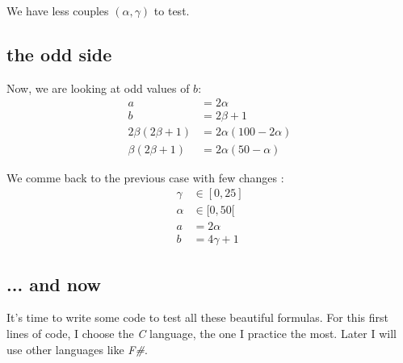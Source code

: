 We have less couples $(\alpha, \gamma)$ to test.

\subsection{the odd side}
Now, we are looking at odd values of $b$:
\begin{equation}\label{eq:pow2odd}
\begin{split}
	a &= 2 \alpha \\
	b &= 2 \beta + 1\\
	2 \beta(2 \beta + 1) &= 2 \alpha(100 - 2 \alpha) \\
	\beta(2\beta + 1) &= 2 \alpha(50 - \alpha)
\end{split}
\end{equation}

We comme back to the previous case with few changes :
\begin{equation}\label{eq:pow2:5}
\begin{split}
	\gamma &\in [0, 25] \\
	\alpha &\in [0, 50[ \\
	a &= 2 \alpha \\
	b &= 4 \gamma + 1
\end{split}
\end{equation}

\subsection{... and now}
It's time to write some code to test all these beautiful formulas. For this first lines of code, I
choose the \emph{C} language, the one I practice the most. Later I will use other languages like \emph{F\#}.

